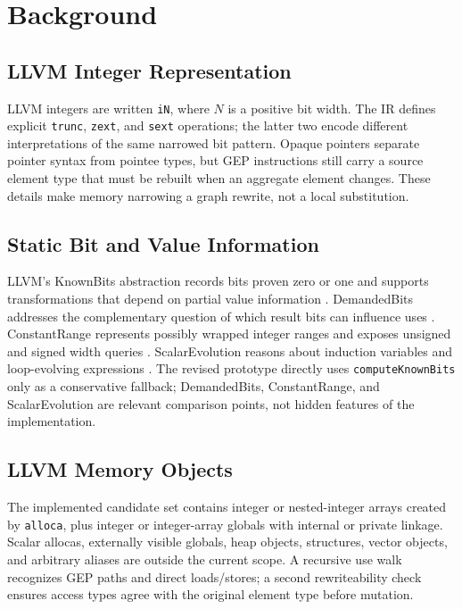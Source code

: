 \documentclass[11pt,twocolumn]{article}
\begin{document}
\section{Background}

\subsection{LLVM Integer Representation}

LLVM integers are written \texttt{iN}, where $N$ is a positive bit width. The IR
defines explicit \texttt{trunc}, \texttt{zext}, and \texttt{sext} operations;
the latter two encode different interpretations of the same narrowed bit
pattern. Opaque pointers separate pointer syntax from pointee types, but GEP
instructions still carry a source element type that must be rebuilt when an
aggregate element changes. These details make memory narrowing a graph rewrite,
not a local substitution.

\subsection{Static Bit and Value Information}

LLVM's KnownBits abstraction records bits proven zero or one and supports
transformations that depend on partial value information
\citep{llvmKnownBits}. DemandedBits addresses the complementary question of
which result bits can influence uses \citep{llvmDemandedBits}. ConstantRange
represents possibly wrapped integer ranges and exposes unsigned and signed
width queries \citep{llvmConstantRange}. ScalarEvolution reasons about induction
variables and loop-evolving expressions \citep{llvmScalarEvolution}. The revised
prototype directly uses \texttt{computeKnownBits} only as a conservative fallback;
DemandedBits, ConstantRange, and ScalarEvolution are relevant comparison points,
not hidden features of the implementation.

\subsection{LLVM Memory Objects}

The implemented candidate set contains integer or nested-integer arrays created
by \texttt{alloca}, plus integer or integer-array globals with internal or
private linkage. Scalar allocas, externally visible globals, heap objects,
structures, vector objects, and arbitrary aliases are outside the current
scope. A recursive use walk recognizes GEP paths and direct loads/stores; a
second rewriteability check ensures access types agree with the original element
type before mutation.
\end{document}
